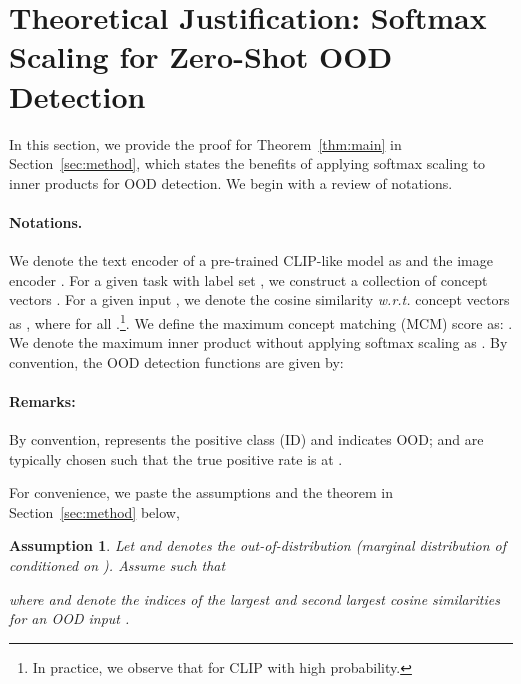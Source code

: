 \documentclass{article}
\newtheorem{assumption}{Assumption}[section]
\begin{document}



\medskip



\newpage




\appendix
\section{Theoretical Justification: Softmax Scaling for Zero-Shot OOD Detection}
\label{sec:proof}
In this section, we provide the proof for Theorem~\ref{thm:main} in Section~\ref{sec:method}, which states the benefits of applying softmax scaling to inner products for OOD detection. We begin with a review of notations.

\paragraph{Notations.} We denote the text encoder of a pre-trained CLIP-like model as  and the image encoder . For a given task with label set , we construct a collection of concept vectors . For a given input , we denote the cosine similarity \emph{w.r.t.} concept vectors as , where  for all .\footnote{In practice, we observe that  for CLIP with high probability.}. We define the maximum concept matching (MCM) score as: . We denote the maximum inner product without applying softmax scaling as . By convention, the OOD detection functions are given by:



\paragraph{Remarks:} By convention,  represents the positive class (ID) and  indicates OOD;  and  are typically chosen such that the true positive rate is at .

For convenience, we paste the assumptions and the theorem in Section~\ref{sec:method} below,

\begin{assumption}
\label{thm:sep} Let  and  denotes the out-of-distribution  (marginal distribution of  conditioned on ). Assume  such that

where  and  denote the indices of the largest and second largest cosine similarities for an OOD input . 
\end{assumption}
\end{document}
